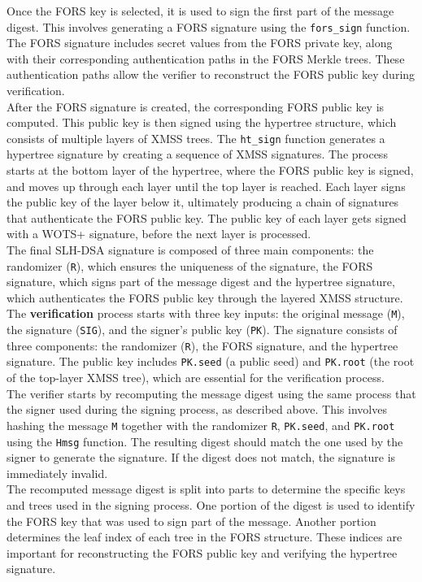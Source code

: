 \documentclass[journal=tosc,notanonymous]{iacrtrans}
\begin{document}
Once the FORS key is selected, it is used to sign the first part of the message digest. This involves generating a FORS signature using the \verb|fors_sign| function. The FORS signature includes secret values from the FORS private key, along with their corresponding authentication paths in the FORS Merkle trees. These authentication paths allow the verifier to reconstruct the FORS public key during verification.\\
After the FORS signature is created, the corresponding FORS public key is computed. This public key is then signed using the hypertree structure, which consists of multiple layers of XMSS trees. The \verb|ht_sign| function generates a hypertree signature by creating a sequence of XMSS signatures. The process starts at the bottom layer of the hypertree, where the FORS public key is signed, and moves up through each layer until the top layer is reached. Each layer signs the public key of the layer below it, ultimately producing a chain of signatures that authenticate the FORS public key. The public key of each layer gets signed with a WOTS+ signature, before the next layer is processed.\\
The final SLH-DSA signature is composed of three main components:
the randomizer (\texttt{R}), which ensures the uniqueness of the signature, the FORS signature, which signs part of the message digest and the hypertree signature, which authenticates the FORS public key through the layered XMSS structure.\\
\newline
The \textbf{verification} process starts with three key inputs: the original message (\texttt{M}), the signature (\texttt{SIG}), and the signer's public key (\texttt{PK}). The signature consists of three components: the randomizer (\texttt{R}), the FORS signature, and the hypertree signature. The public key includes \texttt{PK.seed} (a public seed) and \texttt{PK.root} (the root of the top-layer XMSS tree), which are essential for the verification process.\\
The verifier starts by recomputing the message digest using the same process that the signer used during the signing process, as described above. This involves hashing the message \texttt{M} together with the randomizer \texttt{R}, \texttt{PK.seed}, and \texttt{PK.root} using the \texttt{Hmsg} function. The resulting digest should match the one used by the signer to generate the signature. If the digest does not match, the signature is immediately invalid.\\
The recomputed message digest is split into parts to determine the specific keys and trees used in the signing process. One portion of the digest is used to identify the FORS key that was used to sign part of the message. Another portion determines the leaf index of each tree in the FORS structure. These indices are important for reconstructing the FORS public key and verifying the hypertree signature.\\
\end{document}
